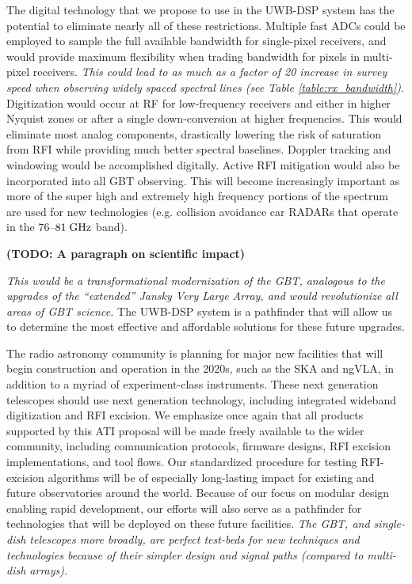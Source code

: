 \documentclass[10pt]{myNSF}
\begin{document}
The digital technology that we propose to use in the UWB-DSP system
has the potential to eliminate nearly all of these restrictions.
Multiple fast ADCs could be employed to sample the full available
bandwidth for single-pixel receivers, and would provide maximum
flexibility when trading bandwidth for pixels in multi-pixel
receivers.  \emph{This could lead to as much as a factor of 20
  increase in survey speed when observing widely spaced spectral lines
  (see Table \ref{table:rx_bandwidth})}.  Digitization would occur at
RF for low-frequency receivers and either in higher Nyquist zones or
after a single down-conversion at higher frequencies.  This would
eliminate most analog components, drastically lowering the risk of
saturation from RFI while providing much better spectral baselines.
Doppler tracking and windowing would be accomplished digitally.
Active RFI mitigation would also be incorporated into all GBT
observing.  This will become increasingly important as more of the
super high and extremely high frequency portions of the spectrum are
used for new technologies (e.g. collision avoidance car RADARs that
operate in the $76$--$81\; \textrm{GHz}$ band).

\textbf{(TODO: A paragraph on scientific impact)}

\emph{This would be a transformational modernization of
  the GBT, analogous to the upgrades of the ``extended'' Jansky Very
  Large Array, and would revolutionize all areas of GBT science.}  The
UWB-DSP system is a pathfinder that will allow us to determine the
most effective and affordable solutions for these future upgrades.


The radio astronomy community is planning for major new facilities
that will begin construction and operation in the 2020s, such as the
SKA and ngVLA, in addition to a myriad of experiment-class
instruments.  These next generation telescopes should use next
generation technology, including integrated wideband digitization and
RFI excision.  We emphasize once again that all products supported by
this ATI proposal will be made freely available to the wider
community, including communication protocols, firmware designs, RFI
excision implementations, and tool flows.  Our standardized procedure
for testing RFI-excision algorithms will be of especially long-lasting
impact for existing and future observatories around the world.
Because of our focus on modular design enabling rapid development, our
efforts will also serve as a pathfinder for technologies that will be
deployed on these future facilities.  \emph{The GBT, and single-dish
  telescopes more broadly, are perfect test-beds for new techniques
  and technologies because of their simpler design and signal paths
  (compared to multi-dish arrays).}
\end{document}
